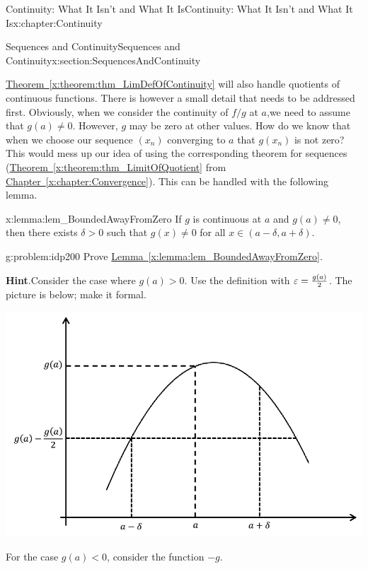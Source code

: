 \begin{chapterptx}{Continuity: What It Isn't and What It Is}{}{Continuity: What It Isn't and What It Is}{}{}{x:chapter:Continuity}
\begin{sectionptx}{Sequences and Continuity}{}{Sequences and Continuity}{}{}{x:section:SequencesAndContinuity}
		\par
		\hyperref[x:theorem:thm_LimDefOfContinuity]{Theorem~{\xreffont\ref{x:theorem:thm_LimDefOfContinuity}}} will also handle quotients of continuous functions. There is however a small detail that needs to be addressed first. Obviously, when we consider the continuity of \(f/g\) at \(a\),\(\)we need to assume that \(g(a)\neq 0\). However, \(g\) may be zero at other values. How do we know that when we choose our sequence \(\left(x_n\right)\) converging to \(a\) that \(g(x_n)\) is not zero? This would mess up our idea of using the corresponding theorem for sequences (\hyperref[x:theorem:thm_LimitOfQuotient]{Theorem~{\xreffont\ref{x:theorem:thm_LimitOfQuotient}}} from \hyperref[x:chapter:Convergence]{Chapter~{\xreffont\ref{x:chapter:Convergence}}}). This can be handled with the following lemma.%
		\begin{lemma}{}{}{x:lemma:lem_BoundedAwayFromZero}%
			If \(g\) is continuous at \(a\) and \(g(a)\neq 0\), then there exists \(\delta>0\) such that \(g(x)\neq 0\) for all \(x\in(a-\delta,a+\delta)\).%
		\end{lemma}
		\begin{problem}{}{g:problem:idp200}%
			Prove \hyperref[x:lemma:lem_BoundedAwayFromZero]{Lemma~{\xreffont\ref{x:lemma:lem_BoundedAwayFromZero}}}.%
			\par\smallskip%
			\noindent\textbf{\blocktitlefont Hint}.\hypertarget{g:hint:idp201}{}\quad{}Consider the case where \(g(a)>0\). Use the definition with \(\varepsilon=\frac{g(a)}{2}\). The picture is below; make it formal.%
			\begin{image}{0.125}{0.75}{0.125}%
				\includegraphics[width=\linewidth]{external/images/Ch5fig8.png}
			\end{image}%
			For the case \(g(a)\lt 0\), consider the function \(-g\).%

\end{problem}
\end{sectionptx}
\end{chapterptx}
